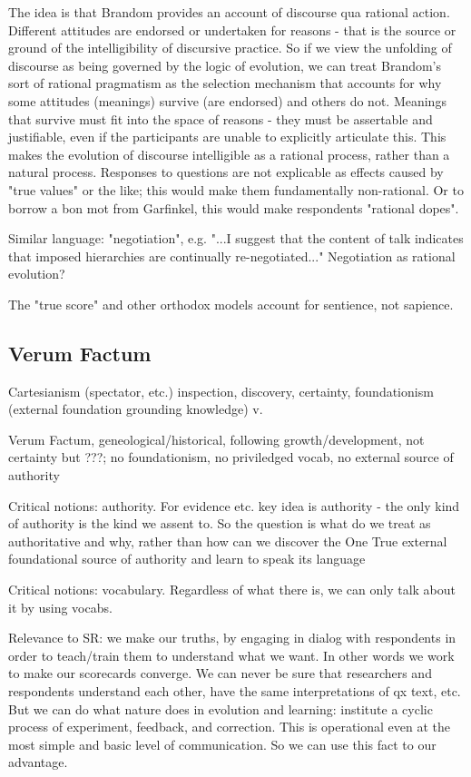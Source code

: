 \documentclass[11pt,twoside]{article}
\begin{document}
The idea is that Brandom provides an account of discourse qua rational
action.  Different attitudes are endorsed or undertaken for reasons -
that is the source or ground of the intelligibility of discursive
practice.  So if we view the unfolding of discourse as being governed
by the logic of evolution, we can treat Brandom's sort of rational
pragmatism as the selection mechanism that accounts for why some
attitudes (meanings) survive (are endorsed) and others do not.
Meanings that survive must fit into the space of reasons - they must
be assertable and justifiable, even if the participants are unable to
explicitly articulate this.  This makes the evolution of discourse
intelligible as a rational process, rather than a natural process.
Responses to questions are not explicable as effects caused by "true
values" or the like; this would make them fundamentally non-rational.
Or to borrow a bon mot from Garfinkel, this would make respondents
"rational dopes".

Similar language: "negotiation", e.g. "...I suggest that the content
of talk indicates that imposed hierarchies are continually
re-negotiated..."  Negotiation as rational evolution?

The "true score" and other orthodox models account for sentience, not
sapience.

\subsection{Verum Factum}

Cartesianism (spectator, etc.) inspection, discovery, certainty,
foundationism (external foundation grounding knowledge) v.

Verum Factum, geneological/historical, following growth/development,
not certainty but ???; no foundationism, no priviledged vocab, no
external source of authority

Critical notions: authority.  For evidence etc. key idea is authority - the only
kind of authority is the kind we assent to.  So the question is what
do we treat as authoritative and why, rather than how can we discover
the One True external foundational source of authority and learn to
speak its language

Critical notions: vocabulary.  Regardless of what there is, we can
only talk about it by using vocabs.

Relevance to SR: we make our truths, by engaging in dialog with
respondents in order to teach/train them to understand what we want.
In other words we work to make our scorecards converge.  We can never
be sure that researchers and respondents understand each other, have
the same interpretations of qx text, etc.  But we can do what nature
does in evolution and learning: institute a cyclic process of
experiment, feedback, and correction.  This is operational even at the
most simple and basic level of communication.  So we can use this fact
to our advantage.
\end{document}
